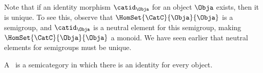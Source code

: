 Note that if an identity morphism $\catid_{\Obja}$ for an object $\Obja$ exists, then it is unique.
To see this, observe that $\HomSet{\CatC}{\Obja}{\Obja}$ is a semigroup, and $\catid_{\Obja}$ is a neutral element for this semigroup, making $\HomSet{\CatC}{\Obja}{\Obja}$ a monoid.
We have seen earlier that neutral elements for semigroups must be unique.

\begin{ctdefinition}[Category]
    \label{def:categorymain}
    A \emph{}~\CatC is a semicategory in which there is an identity for every object.
\end{ctdefinition}

